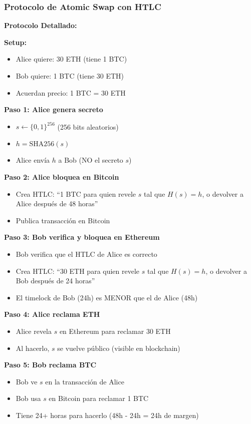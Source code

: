 \documentclass[11pt,a4paper,twoside]{book}
\begin{document}
\subsubsection{Protocolo de Atomic Swap con HTLC}

\begin{mathnote}
\textbf{Protocolo Detallado:}

\textbf{Setup:}
\begin{itemize}
    \item Alice quiere: 30 ETH (tiene 1 BTC)
    \item Bob quiere: 1 BTC (tiene 30 ETH)
    \item Acuerdan precio: 1 BTC = 30 ETH
\end{itemize}

\textbf{Paso 1: Alice genera secreto}
\begin{itemize}
    \item $s \leftarrow \{0,1\}^{256}$ (256 bits aleatorios)
    \item $h = \text{SHA256}(s)$
    \item Alice env\'ia $h$ a Bob (NO el secreto $s$)
\end{itemize}

\textbf{Paso 2: Alice bloquea en Bitcoin}
\begin{itemize}
    \item Crea HTLC: ``1 BTC para quien revele $s$ tal que $H(s) = h$, o devolver a Alice despu\'es de 48 horas''
    \item Publica transacci\'on en Bitcoin
\end{itemize}

\textbf{Paso 3: Bob verifica y bloquea en Ethereum}
\begin{itemize}
    \item Bob verifica que el HTLC de Alice es correcto
    \item Crea HTLC: ``30 ETH para quien revele $s$ tal que $H(s) = h$, o devolver a Bob despu\'es de 24 horas''
    \item El timelock de Bob (24h) es MENOR que el de Alice (48h)
\end{itemize}

\textbf{Paso 4: Alice reclama ETH}
\begin{itemize}
    \item Alice revela $s$ en Ethereum para reclamar 30 ETH
    \item Al hacerlo, $s$ se vuelve p\'ublico (visible en blockchain)
\end{itemize}

\textbf{Paso 5: Bob reclama BTC}
\begin{itemize}
    \item Bob ve $s$ en la transacci\'on de Alice
    \item Bob usa $s$ en Bitcoin para reclamar 1 BTC
    \item Tiene 24+ horas para hacerlo (48h - 24h = 24h de margen)
\end{itemize}
\end{mathnote}
\end{document}
